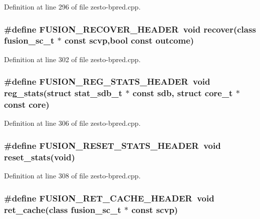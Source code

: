 Definition at line 296 of file zesto-bpred.cpp.
\subsubsection[{FUSION\_\-RECOVER\_\-HEADER}]{\setlength{\rightskip}{0pt plus 5cm}\#define FUSION\_\-RECOVER\_\-HEADER~void recover(class {\bf fusion\_\-sc\_\-t} $\ast$ const scvp,bool const outcome)}\label{zesto-bpred_8cpp_a85d7386d0dba9b2de10046e926a1f1c}




Definition at line 302 of file zesto-bpred.cpp.
\subsubsection[{FUSION\_\-REG\_\-STATS\_\-HEADER}]{\setlength{\rightskip}{0pt plus 5cm}\#define FUSION\_\-REG\_\-STATS\_\-HEADER~void reg\_\-stats(struct {\bf stat\_\-sdb\_\-t} $\ast$ const sdb, struct {\bf core\_\-t} $\ast$ const core)}\label{zesto-bpred_8cpp_7950415891b9a628fbc8bc412cb34be2}




Definition at line 306 of file zesto-bpred.cpp.
\subsubsection[{FUSION\_\-RESET\_\-STATS\_\-HEADER}]{\setlength{\rightskip}{0pt plus 5cm}\#define FUSION\_\-RESET\_\-STATS\_\-HEADER~void reset\_\-stats(void)}\label{zesto-bpred_8cpp_0ffb8b8103905fb7789e043d6cf8b317}




Definition at line 308 of file zesto-bpred.cpp.
\subsubsection[{FUSION\_\-RET\_\-CACHE\_\-HEADER}]{\setlength{\rightskip}{0pt plus 5cm}\#define FUSION\_\-RET\_\-CACHE\_\-HEADER~void ret\_\-cache(class {\bf fusion\_\-sc\_\-t} $\ast$ const scvp)}\label{zesto-bpred_8cpp_a3dd97bdb6f4ec662f90935920f2eeda}




